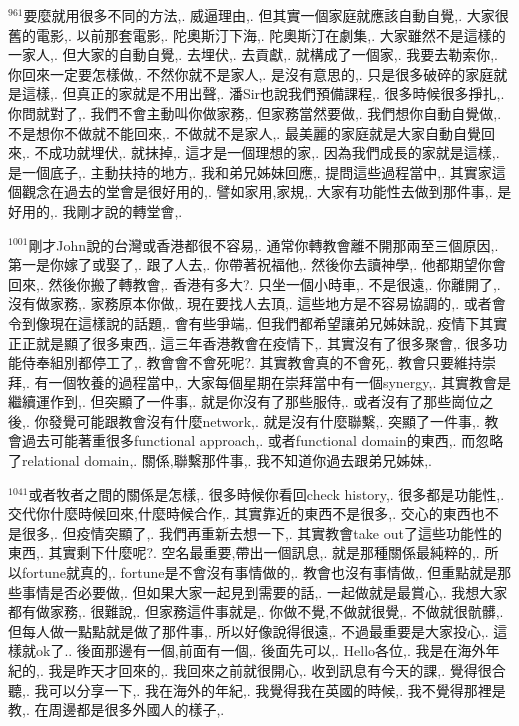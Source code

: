 \documentclass{book}
\begin{document}
$^{961}$要麼就用很多不同的方法,.
威逼理由,.
但其實一個家庭就應該自動自覺,.
大家很舊的電影,.
以前那套電影,.
陀奧斯汀下海,.
陀奧斯汀在劇集,.
大家雖然不是這樣的一家人,.
但大家的自動自覺,.
去埋伏,.
去貢獻,.
就構成了一個家,.
我要去勒索你,.
你回來一定要怎樣做,.
不然你就不是家人,.
是沒有意思的,.
只是很多破碎的家庭就是這樣,.
但真正的家就是不用出聲,.
潘Sir也說我們預備課程,.
很多時候很多掙扎,.
你問就對了,.
我們不會主動叫你做家務,.
但家務當然要做,.
我們想你自動自覺做,.
不是想你不做就不能回來,.
不做就不是家人,.
最美麗的家庭就是大家自動自覺回來,.
不成功就埋伏,.
就抹掉,.
這才是一個理想的家,.
因為我們成長的家就是這樣,.
是一個底子,.
主動扶持的地方,.
我和弟兄姊妹回應,.
提問這些過程當中,.
其實家這個觀念在過去的堂會是很好用的,.
譬如家用,家規,.
大家有功能性去做到那件事,.
是好用的,.
我剛才說的轉堂會,.

$^{1001}$剛才John說的台灣或香港都很不容易,.
通常你轉教會離不開那兩至三個原因,.
第一是你嫁了或娶了,.
跟了人去,.
你帶著祝福他,.
然後你去讀神學,.
他都期望你會回來,.
然後你搬了轉教會,.
香港有多大?.
只坐一個小時車,.
不是很遠,.
你離開了,.
沒有做家務,.
家務原本你做,.
現在要找人去頂,.
這些地方是不容易協調的,.
或者會令到像現在這樣說的話題,.
會有些爭端,.
但我們都希望讓弟兄姊妹說,.
疫情下其實正正就是顯了很多東西,.
這三年香港教會在疫情下,.
其實沒有了很多聚會,.
很多功能侍奉組別都停工了,.
教會會不會死呢?.
其實教會真的不會死,.
教會只要維持崇拜,.
有一個牧養的過程當中,.
大家每個星期在崇拜當中有一個synergy,.
其實教會是繼續運作到,.
但突顯了一件事,.
就是你沒有了那些服侍,.
或者沒有了那些崗位之後,.
你發覺可能跟教會沒有什麼network,.
就是沒有什麼聯繫,.
突顯了一件事,.
教會過去可能著重很多functional approach,.
或者functional domain的東西,.
而忽略了relational domain,.
關係,聯繫那件事,.
我不知道你過去跟弟兄姊妹,.

$^{1041}$或者牧者之間的關係是怎樣,.
很多時候你看回check history,.
很多都是功能性,.
交代你什麼時候回來,什麼時候合作,.
其實靠近的東西不是很多,.
交心的東西也不是很多,.
但疫情突顯了,.
我們再重新去想一下,.
其實教會take out了這些功能性的東西,.
其實剩下什麼呢?.
空名最重要,帶出一個訊息,.
就是那種關係最純粹的,.
所以fortune就真的,.
fortune是不會沒有事情做的,.
教會也沒有事情做,.
但重點就是那些事情是否必要做,.
但如果大家一起見到需要的話,.
一起做就是最賞心,.
我想大家都有做家務,.
很難說,.
但家務這件事就是,.
你做不覺,不做就很覺,.
不做就很骯髒,.
但每人做一點點就是做了那件事,.
所以好像說得很遠,.
不過最重要是大家投心,.
這樣就ok了..
後面那邊有一個,前面有一個,.
後面先可以,.
Hello各位,.
我是在海外年紀的,.
我是昨天才回來的,.
我回來之前就很開心,.
收到訊息有今天的課,.
覺得很合聽,.
我可以分享一下,.
我在海外的年紀,.
我覺得我在英國的時候,.
我不覺得那裡是教,.
在周邊都是很多外國人的樣子,.
\end{document}
